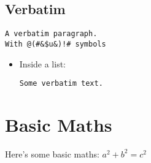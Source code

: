 \documentclass[
  text,
  markdown,
  basic maths
]{internet}
\begin{document}
\subsection{Verbatim}

\begin{verbatim}
A verbatim paragraph.
With @(#&$u&)!# symbols
\end{verbatim}

\begin{itemize}
\item Inside a list:

\begin{verbatim}
Some verbatim text.
\end{verbatim}

\end{itemize}

\section{Basic Maths}

Here's some basic maths: \(a^2 + b^2 = c^2\)
\end{document}
